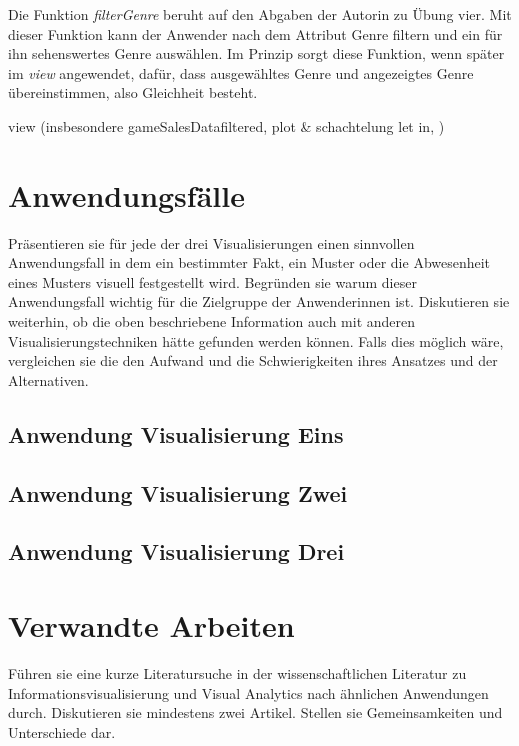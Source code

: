 \documentclass[usegeometry=true]{scrartcl}
\begin{document}
Die Funktion \textit{filterGenre} beruht auf den Abgaben der Autorin zu Übung vier. Mit dieser Funktion kann der Anwender nach dem Attribut Genre filtern und ein für ihn sehenswertes Genre auswählen.
Im Prinzip sorgt diese Funktion, wenn später im \textit{view} angewendet, dafür, dass ausgewähltes Genre und angezeigtes Genre übereinstimmen, also Gleichheit besteht.

view (insbesondere gameSalesDatafiltered, plot & schachtelung let in, )


\section{Anwendungsfälle}
Präsentieren sie für jede der drei Visualisierungen einen sinnvollen Anwendungsfall in dem ein bestimmter Fakt, ein Muster oder die Abwesenheit eines Musters visuell festgestellt wird. Begründen sie warum dieser Anwendungsfall wichtig für die Zielgruppe der Anwenderinnen ist. Diskutieren sie weiterhin, ob die oben beschriebene Information auch mit anderen Visualisierungstechniken hätte gefunden werden können. Falls dies möglich wäre, vergleichen sie die den Aufwand und die Schwierigkeiten ihres Ansatzes und der Alternativen. 
\subsection{Anwendung Visualisierung Eins}
\subsection{Anwendung Visualisierung Zwei}
\subsection{Anwendung Visualisierung Drei}

\section{Verwandte Arbeiten}
Führen sie eine kurze Literatursuche in der wissenschaftlichen Literatur zu Informationsvisualisierung und Visual Analytics nach ähnlichen Anwendungen durch. Diskutieren sie mindestens zwei Artikel. Stellen sie Gemeinsamkeiten und Unterschiede dar.
\end{document}
